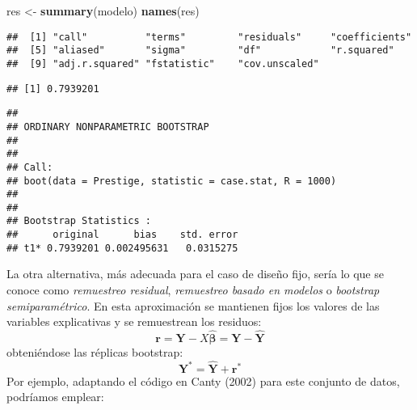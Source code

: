 \documentclass[
]{book}
\newenvironment{Shaded}{\begin{snugshade}}{\end{snugshade}}
\newcommand{\ControlFlowTok}[1]{\textcolor[rgb]{0.13,0.29,0.53}{\textbf{#1}}}
\newcommand{\DataTypeTok}[1]{\textcolor[rgb]{0.13,0.29,0.53}{#1}}
\newcommand{\DecValTok}[1]{\textcolor[rgb]{0.00,0.00,0.81}{#1}}
\newcommand{\KeywordTok}[1]{\textcolor[rgb]{0.13,0.29,0.53}{\textbf{#1}}}
\newcommand{\NormalTok}[1]{#1}
\newcommand{\OperatorTok}[1]{\textcolor[rgb]{0.81,0.36,0.00}{\textbf{#1}}}
\newcommand{\StringTok}[1]{\textcolor[rgb]{0.31,0.60,0.02}{#1}}
\theoremstyle{definition}
\theoremstyle{definition}
\theoremstyle{definition}
\theoremstyle{remark}
\begin{document}
\begin{Shaded}
\begin{Highlighting}[]
\NormalTok{res <-}\StringTok{ }\KeywordTok{summary}\NormalTok{(modelo)}
\KeywordTok{names}\NormalTok{(res)}
\end{Highlighting}
\end{Shaded}

\begin{verbatim}
##  [1] "call"          "terms"         "residuals"     "coefficients" 
##  [5] "aliased"       "sigma"         "df"            "r.squared"    
##  [9] "adj.r.squared" "fstatistic"    "cov.unscaled"
\end{verbatim}

\begin{Shaded}
\end{Shaded}

\begin{verbatim}
## [1] 0.7939201
\end{verbatim}

\begin{Shaded}
\end{Shaded}

\begin{verbatim}
## 
## ORDINARY NONPARAMETRIC BOOTSTRAP
## 
## 
## Call:
## boot(data = Prestige, statistic = case.stat, R = 1000)
## 
## 
## Bootstrap Statistics :
##      original      bias    std. error
## t1* 0.7939201 0.002495631   0.0315275
\end{verbatim}

La otra alternativa, más adecuada para el caso de diseño fijo, sería
lo que se conoce como \emph{remuestreo residual}, \emph{remuestreo basado en modelos} o \emph{bootstrap semiparamétrico}.
En esta aproximación se mantienen fijos los valores de las variables
explicativas y se remuestrean los residuos:
\[\mathbf{r} = \mathbf{Y} - X\hat{\mathbf{\beta}} = \mathbf{Y} - \hat{\mathbf{Y}}\]
obteniéndose las réplicas bootstrap:
\[\mathbf{Y}^{\ast} = \hat{\mathbf{Y}} + \mathbf{r}^{\ast}\]
Por ejemplo, adaptando el código en Canty (2002) para este conjunto de
datos, podríamos emplear:
\end{document}

